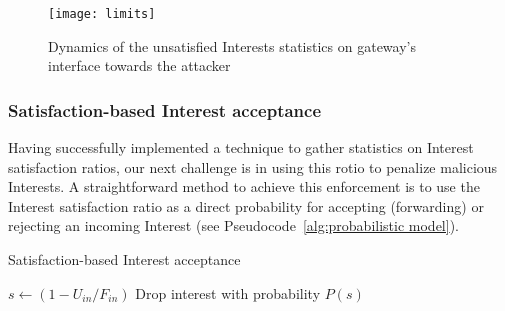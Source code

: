 \begin{figure}[htbp]
  \centering
  \texttt{[image: limits]}
  \caption{Dynamics of the unsatisfied Interests statistics on gateway's interface towards the attacker}
  \label{fig:ratio example}
\end{figure}


\subsubsection{\textbf{Satisfaction-based Interest acceptance}}
\label{sec:probabilistic}

Having successfully implemented a technique to gather statistics on Interest satisfaction ratios, our next challenge is in using this rotio to penalize malicious Interests. A straightforward method to achieve this enforcement is to use the Interest satisfaction ratio as a direct probability for accepting (forwarding) or rejecting an incoming Interest (see Pseudocode~\ref{alg:probabilistic model}).




\begin{algorithm}[h]
\footnotesize
\caption{\small Satisfaction-based Interest acceptance}
\label{alg:probabilistic model}
\begin{algorithmic}[1]
\State{} 

\vspace{0.1cm}

    \State{} 
    \State{} 
    
     
        \State $s \leftarrow (1 - U_{in} / F_{in})$
        \State Drop interest with probability $P(s)$
    \EndIf

\EndFunction

\end{algorithmic}
\end{algorithm}

